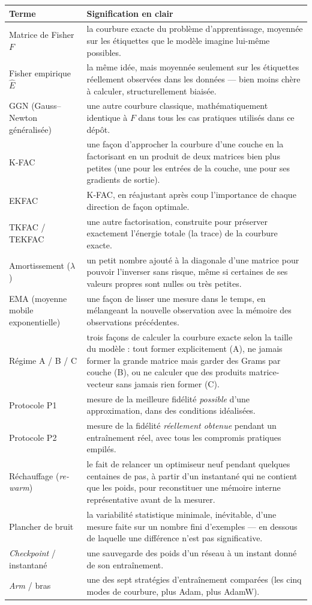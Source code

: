 \documentclass[11pt,a4paper]{article}
\newcommand{\eng}[1]{\emph{#1}}
\begin{document}
\begin{longtable}{@{}p{3.4cm}p{11.6cm}@{}}
\toprule
Terme & Signification en clair \\
\midrule
\endhead
Matrice de Fisher $F$ & la courbure exacte du problème d'apprentissage, moyennée sur les étiquettes
que le modèle imagine lui-même possibles. \\
Fisher empirique $\hat E$ & la même idée, mais moyennée seulement sur les étiquettes réellement
observées dans les données — bien moins chère à calculer, structurellement biaisée. \\
GGN (Gauss--Newton généralisée) & une autre courbure classique, mathématiquement identique à $F$
dans tous les cas pratiques utilisés dans ce dépôt. \\
K-FAC & une façon d'approcher la courbure d'une couche en la factorisant en un produit de deux
matrices bien plus petites (une pour les entrées de la couche, une pour ses gradients de sortie). \\
EKFAC & K-FAC, en réajustant après coup l'importance de chaque direction de façon optimale. \\
TKFAC / TEKFAC & une autre factorisation, construite pour préserver exactement l'énergie totale
(la trace) de la courbure exacte. \\
Amortissement ($\lambda$) & un petit nombre ajouté à la diagonale d'une matrice pour pouvoir
l'inverser sans risque, même si certaines de ses valeurs propres sont nulles ou très petites. \\
EMA (moyenne mobile exponentielle) & une façon de lisser une mesure dans le temps, en mélangeant
la nouvelle observation avec la mémoire des observations précédentes. \\
Régime A / B / C & trois façons de calculer la courbure exacte selon la taille du modèle : tout
former explicitement (A), ne jamais former la grande matrice mais garder des Grams par couche (B),
ou ne calculer que des produits matrice-vecteur sans jamais rien former (C). \\
Protocole P1 & mesure de la meilleure fidélité \emph{possible} d'une approximation, dans des
conditions idéalisées. \\
Protocole P2 & mesure de la fidélité \emph{réellement obtenue} pendant un entraînement réel, avec
tous les compromis pratiques empilés. \\
Réchauffage (\eng{re-warm}) & le fait de relancer un optimiseur neuf pendant quelques centaines de
pas, à partir d'un instantané qui ne contient que les poids, pour reconstituer une mémoire interne
représentative avant de la mesurer. \\
Plancher de bruit & la variabilité statistique minimale, inévitable, d'une mesure faite sur un
nombre fini d'exemples — en dessous de laquelle une différence n'est pas significative. \\
\eng{Checkpoint} / instantané & une sauvegarde des poids d'un réseau à un instant donné de son
entraînement. \\
\eng{Arm} / bras & une des sept stratégies d'entraînement comparées (les cinq modes de courbure,
plus Adam, plus AdamW). \\
\bottomrule
\end{longtable}
\end{document}
